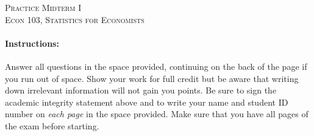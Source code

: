 \documentclass[addpoints,12pt]{exam}
\begin{document}
\begin{center}
\textsc{\Large Practice Midterm I\\\vspace{0.15in} \normalsize Econ 103, Statistics for Economists }%

\vspace{2em}



\end{center}


\vspace{2em}
\begin{center}
\end{center}
\vspace{0.2in}

\vspace{0.2in}

\noindent{}

\vspace{0.2in}

\noindent{}
\hfill
{}

\vspace{2em}



\paragraph{Instructions:} Answer all questions in the space provided, continuing on the back of the page if you run out of space. Show your work for full credit but be aware that writing down irrelevant information will not gain you points. Be sure to sign the academic integrity statement above and to write your name and student ID number on \emph{each page} in the space provided. Make sure that you have all pages of the exam before starting.
\end{document}

